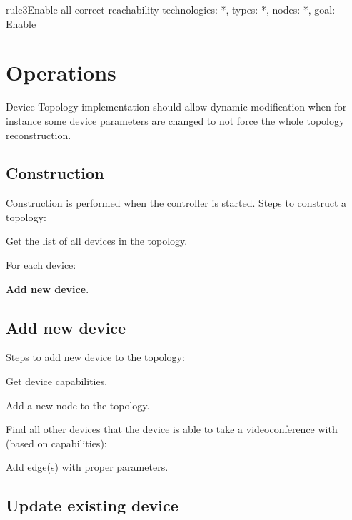 \begin{ResourceExample}{}{rule3}{Enable all correct reachability}
technologies: *,
types: *,
nodes: *,
goal: Enable
\end{ResourceExample}

\section{Operations}

Device Topology implementation should allow dynamic modification when for 
instance some device parameters are changed to not force the whole topology 
reconstruction.      
      
\subsection*{Construction}

Construction is performed when the controller is started. Steps to construct a 
topology:

\begin{compactenum}
\item Get the list of all devices in the topology.
\item For each device: 
  \begin{compactitem}
  \item \textbf{Add new device}.
  \end{compactitem}
\end{compactenum}     

\subsection*{Add new device}     

Steps to add new device to the topology:
\begin{compactenum}
\item Get device capabilities.
\item Add a new node to the topology.
\item Find all other devices that the device is able to take a videoconference 
  with (based on capabilities):
  \begin{compactitem}
  \item Add edge(s) with proper parameters.
  \end{compactitem}
\end{compactenum}  

\subsection*{Update existing device}     

